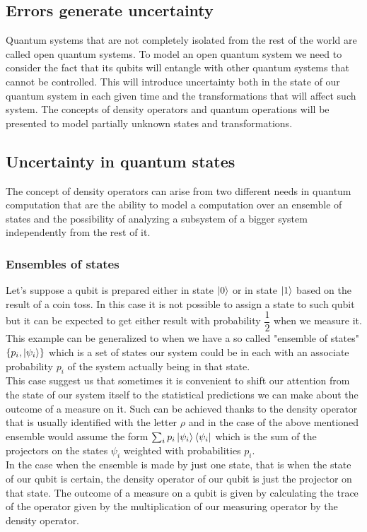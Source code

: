 \documentclass{article}
\begin{document}
\subsection{Errors generate uncertainty}

Quantum systems that are not completely isolated from the rest of
the world are called open quantum systems.
To model an open quantum system we need to consider the fact that
its qubits will entangle with other quantum systems that cannot be controlled.
This will introduce uncertainty both in the state of our quantum
system in each given time and the transformations that will affect such system.
The concepts of density operators and quantum operations will be presented to
model partially unknown states and transformations.


\subsection{Uncertainty in quantum states}

The concept of density operators can arise from two different needs in quantum
computation that are the ability to model a computation over an ensemble of states
and the possibility of analyzing a subsystem of a bigger system independently from
the rest of it.

\subsubsection{Ensembles of states}

Let's suppose a qubit is prepared either in state $\ket{0}$ or in
state $\ket{1}$ based on the result of a coin toss.
In this case it is not possible to assign a state to such qubit
but it can be expected to get either result with probability
$\dfrac{1}{2}$  when we measure it.
This example can be generalized to when we have a so called
"ensemble of states" $\{p_i,\ket{\psi_i}\}$ which is a set of
states our system could be in each with an associate probability $p_i$
of the system actually being in that state.\\
This case suggest us that sometimes it is convenient to
shift our attention from the state of our system itself to the
statistical predictions we can make about the outcome of a measure on it.
Such can be achieved thanks to the density operator that
is usually identified with the letter $\rho$ and in the case of the above
mentioned ensemble would assume the form $\sum_i p_i \ket{\psi_i}\bra{\psi_i}$
which is the sum of the projectors on the states $\psi_i$ weighted with
probabilities $p_i$. \\
In the case when the ensemble is made by just one state,
that is when the state of our qubit is certain,
the density operator of our qubit is just the projector on
that state.
The outcome of a measure on a qubit is given by calculating
the trace of the operator given by the multiplication of our
measuring operator by the density operator.
\end{document}
